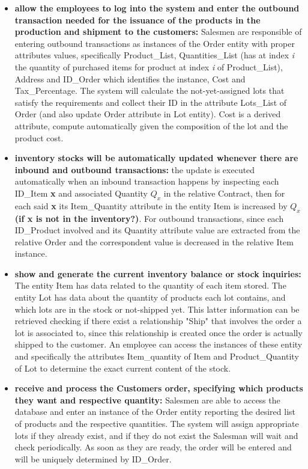 \begin{itemize}
	\item \textbf{allow the employees to log into the system and enter the outbound transaction needed for the issuance of the products in the production and shipment to the customers:} Salesmen are responsible of entering outbound transactions as instances of the Order entity with proper attributes values, specifically Product\_List, Quantities\_List (has at index \textit{i} the quantity of purchased items for product at index \textit{i} of Product\_List), Address and ID\_Order which identifies the instance, Cost and Tax\_Percentage. The system will calculate the not-yet-assigned lots that satisfy the requirements and collect their ID in the attribute Lots\_List of Order (and also update Order attribute in Lot entity). Cost is a derived attribute, compute automatically given the composition of the lot and the product cost.
    \item \textbf{inventory stocks will be automatically updated whenever there are inbound and outbound transactions:} the update is executed automatically when an inbound transaction happens by inspecting each ID\_Item \textbf{x} and associated Quantity \(Q_x\) in the relative Contract, then for each said \textbf{x} its Item\_Quantity attribute in the entity Item is increased by  \(Q_x\) \textbf{(if x is not in the inventory?)}. For outbound transactions, since each ID\_Product involved and its Quantity attribute value are extracted from the relative Order and the correspondent value is decreased in the relative Item instance.
    \item \textbf{show and generate the current inventory balance or stock inquiries:} The entity Item has data related to the quantity of each item stored. The entity Lot has data about the quantity of products each lot contains, and which lots are in the stock or not-shipped yet. This latter information can be retrieved checking if there exist a relationship "Ship" that involves the order a lot is associated to, since this relationship is created once the order is actually shipped to the customer. An employee can access the instances of these entity and specifically the attributes Item\_quantity of Item and Product\_Quantity of Lot to determine the exact current content of the stock.
    \item \textbf{receive and process the Customers order, specifying which products they want and respective   quantity:} Salesmen are able to access the database and enter an instance of the Order entity reporting the desired list of products and the respective quantities. The system will assign appropriate lots if they already exist, and if they do not exist the Salesman will wait and check periodically. As soon as they are ready, the order will be entered and will be uniquely determined by ID\_Order.

\end{itemize}
